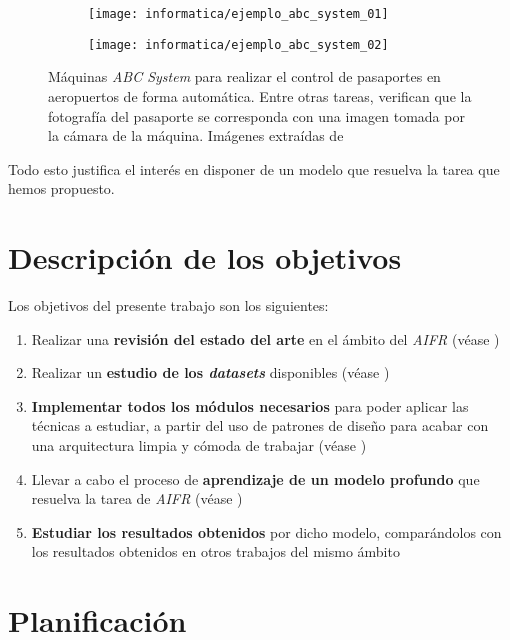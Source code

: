 \begin{figure}[H]
	\centering
	\begin{subfigure}{0.4\textwidth}
		\texttt{[image: informatica/ejemplo\_abc\_system\_01]}
	\end{subfigure}
	\begin{subfigure}{0.4\textwidth}
		\texttt{[image: informatica/ejemplo\_abc\_system\_02]}
	\end{subfigure}

	\caption{Máquinas \textit{ABC System} para realizar el control de pasaportes en aeropuertos de forma automática. Entre otras tareas, verifican que la fotografía del pasaporte se corresponda con una imagen tomada por la cámara de la máquina. Imágenes extraídas de \cite{informatica:articulo_abc_system}}
\end{figure}

Todo esto justifica el interés en disponer de un modelo que resuelva la tarea que hemos propuesto.

\section{Descripción de los objetivos}

Los objetivos del presente trabajo son los siguientes:

\begin{enumerate}
	\item Realizar una \textbf{revisión del estado del arte} en el ámbito del \textit{AIFR} (véase )
	\item Realizar un \textbf{estudio de los \textit{datasets}} disponibles (véase )
	\item \textbf{Implementar todos los módulos necesarios} para poder aplicar las técnicas a estudiar, a partir del uso de patrones de diseño para acabar con una arquitectura limpia y cómoda de trabajar (véase )
	\item Llevar a cabo el proceso de \textbf{aprendizaje de un modelo profundo} que resuelva la tarea de \textit{AIFR} (véase )
	\item \textbf{Estudiar los resultados obtenidos} por dicho modelo, comparándolos con los resultados obtenidos en otros trabajos del mismo ámbito
\end{enumerate}

\section{Planificación} \label{isec:planificacion}

